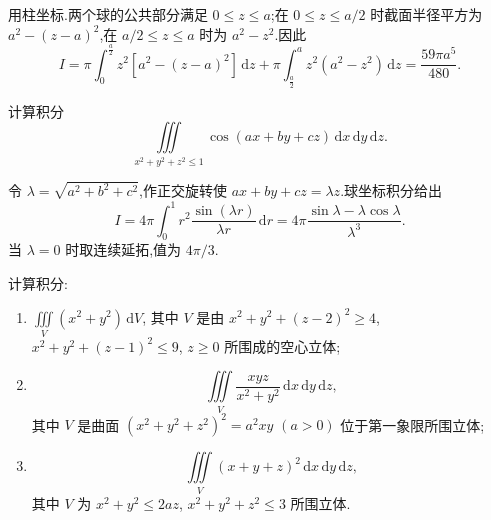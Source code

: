 \begin{solution}
    用柱坐标.两个球的公共部分满足 $0\leq z\leq a$;在 $0\leq z\leq a/2$ 时截面半径平方为 $a^2-(z-a)^2$,在 $a/2\leq z\leq a$ 时为 $a^2-z^2$.因此
    \[
        I=\pi\int_0^{\frac{a}{2}}z^2\left[a^2-(z-a)^2\right]\,\mathrm{d}z
        +\pi\int_{\frac{a}{2}}^{a}z^2(a^2-z^2)\,\mathrm{d}z
        =\dfrac{59\pi a^5}{480}.
    \]
\end{solution}

\begin{example}
    计算积分
    \[
        \displaystyle\iiint\limits_{x^2+y^2+z^2\leq1}\cos(ax+by+cz)\,\mathrm{d}x\,\mathrm{d}y\,\mathrm{d}z.
    \]
\end{example}
\exampleblank

\begin{solution}
    令 $\lambda=\sqrt{a^2+b^2+c^2}$,作正交旋转使 $ax+by+cz=\lambda z$.球坐标积分给出
    \[
        I=4\pi\int_0^1r^2\dfrac{\sin(\lambda r)}{\lambda r}\,\mathrm{d}r
        =4\pi\dfrac{\sin\lambda-\lambda\cos\lambda}{\lambda^3}.
    \]
    当 $\lambda=0$ 时取连续延拓,值为 $4\pi/3$.
\end{solution}

\begin{example}
    计算积分:
    \begin{enumerate}
        \item $\displaystyle\iiint\limits_V(x^2+y^2)\,\mathrm{d}V$, 其中 $V$ 是由 $x^2+y^2+(z-2)^2\geq4$, $x^2+y^2+(z-1)^2\leq9$, $z\geq0$ 所围成的空心立体;
        \item
              \[
                  \displaystyle\iiint\limits_V\dfrac{xyz}{x^2+y^2}\,\mathrm{d}x\,\mathrm{d}y\,\mathrm{d}z,
              \]
              其中 $V$ 是曲面 $(x^2+y^2+z^2)^2=a^2xy$ $(a>0)$ 位于第一象限所围立体;
        \item
              \[
                  \displaystyle\iiint\limits_V(x+y+z)^2\,\mathrm{d}x\,\mathrm{d}y\,\mathrm{d}z,
              \]
              其中 $V$ 为 $x^2+y^2\leq2az$, $x^2+y^2+z^2\leq3$ 所围立体.
    \end{enumerate}
\end{example}
\exampleblank

